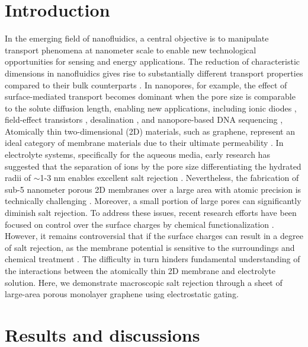 \documentclass[manuscript=letter, email=true, hyperref=true, keywords=false]{achemso}
\begin{document}
\section{Introduction}
\label{sec:intro}
In the emerging field of nanofluidics, a central objective is to
manipulate transport phenomena at nanometer scale to enable new
technological opportunities for sensing and energy applications. The
reduction of characteristic dimensions in nanofluidics gives rise to
substantially different transport properties compared to their bulk
counterparts \cite{Schoch_2008}. In nanopores, for example, the effect
of surface-mediated transport becomes dominant when the pore size is
comparable to the solute diffusion length, enabling new applications,
including ionic diodes \cite{Karnik_2007}, field-effect transistors
\cite{Nam_2009}, desalination , and nanopore-based DNA
sequencing \cite{Heerema_2016,Garaj_2013}, Atomically thin
two-dimensional (2D) materials, such as graphene, represent an ideal
category of membrane materials due to their ultimate permeability
\cite{Cohen_Tanugi_2012}. In electrolyte systems, specifically for the
aqueous media, early research has suggested that the separation of
ions by the pore size differentiating the hydrated radii of
$\sim{}$1-3 nm enables excellent salt rejection . Nevertheless, the
fabrication of sub-5 nanometer porous 2D membranes over a large area
with atomic precision is technically challenging \cite{Suk_2014}
. Moreover, a small portion of large pores
can significantly diminish salt rejection. To address these issues,
recent research efforts have been focused on control over the surface
charges by chemical functionalization . However, it
remains controversial that if the surface charges can result in a
degree of salt rejection, as the membrane potential is sensitive to
the surroundings and chemical treatment . The difficulty
in turn hinders fundamental understanding of the interactions between
the atomically thin 2D membrane and electrolyte solution. Here, we
demonstrate macroscopic salt rejection through a sheet of large-area
porous monolayer graphene using electrostatic gating.

\section{Results and discussions}
\label{sec:res}
\end{document}
